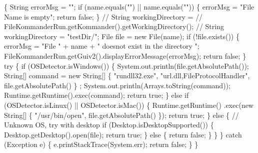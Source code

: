 \begin{DoxyCode}
                                            \{
        String errorMsg = \textcolor{stringliteral}{""};
        \textcolor{keywordflow}{if} (name.equals(\textcolor{stringliteral}{""}) || name.equals(\textcolor{stringliteral}{""})) \{
            errorMsg = \textcolor{stringliteral}{"File Name is empty"};
            \textcolor{keywordflow}{return} \textcolor{keyword}{false};
        \}
        \textcolor{comment}{// String workingDirectory =}
        \textcolor{comment}{// FileKommanderRun.getKommander().getWorkingDirectory();}
    \textcolor{comment}{//  String workingDirectory = "testDir/";}
        File file = \textcolor{keyword}{new} File(name);
        \textcolor{keywordflow}{if} (!file.exists()) \{
            errorMsg = \textcolor{stringliteral}{"File "} + name + \textcolor{stringliteral}{" doesnot exist in the directory "};
            FileKommanderRun.getGuiv2().displayErrorMessage(errorMsg);
            \textcolor{keywordflow}{return} \textcolor{keyword}{false};
        \}
        \textcolor{keywordflow}{try} \{
            \textcolor{keywordflow}{if} (OSDetector.isWindows()) \{
                System.out.println(file.getAbsolutePath());
                String[] command = \textcolor{keyword}{new} String[] \{ \textcolor{stringliteral}{"rundll32.exe"},
                        \textcolor{stringliteral}{"url.dll,FileProtocolHandler"}, file.getAbsolutePath() \}
      ;
                System.out.println(Arrays.toString(command));
                Runtime.getRuntime().exec(command);
                \textcolor{keywordflow}{return} \textcolor{keyword}{true};
            \} \textcolor{keywordflow}{else} \textcolor{keywordflow}{if} (OSDetector.isLinux() || OSDetector.isMac()) \{
                Runtime.getRuntime()
                        .exec(\textcolor{keyword}{new} String[] \{ \textcolor{stringliteral}{"/usr/bin/open"},
                                file.getAbsolutePath() \});
                \textcolor{keywordflow}{return} \textcolor{keyword}{true};
            \} \textcolor{keywordflow}{else} \{
                \textcolor{comment}{// Unknown OS, try with desktop}
                \textcolor{keywordflow}{if} (Desktop.isDesktopSupported()) \{
                    Desktop.getDesktop().open(file);
                    \textcolor{keywordflow}{return} \textcolor{keyword}{true};
                \} \textcolor{keywordflow}{else} \{
                    \textcolor{keywordflow}{return} \textcolor{keyword}{false};
                \}
            \}
        \} \textcolor{keywordflow}{catch} (Exception e) \{
            e.printStackTrace(System.err);
            \textcolor{keywordflow}{return} \textcolor{keyword}{false};
        \}
    \}
\end{DoxyCode}

